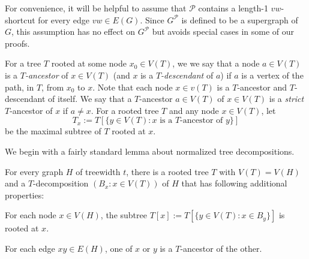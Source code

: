 \documentclass{patmorin}
\newcommand{\tlabel}[1]{\label{t:#1}}
\newcommand{\PP}{\mathcal{P}}
\renewcommand{\le}{\leqslant}
\begin{document}
For convenience, it will be helpful to assume that $\mathcal{P}$ contains a length-1 $vw$-shortcut for every edge $vw\in E(G)$.  Since $G^\PP$ is defined to be a supergraph of $G$, this assumption has no effect on $G^{\mathcal{P}}$ but avoids special cases in some of our proofs.

For a tree $T$ rooted at some node $x_0\in V(T)$, we we say that a node $a\in V(T)$ is a \emph{$T$-ancestor} of $x\in V(T)$ (and $x$ is a \emph{$T$-descendant} of $a$) if $a$ is a vertex of the path, in $T$, from $x_0$ to $x$.  Note that each node $x\in v(T)$ is a $T$-ancestor and $T$-descendant of itself.  We say that a $T$-ancestor $a\in V(T)$ of $x\in V(T)$ is a \emph{strict} $T$-ancestor of $x$ if $a\neq x$. For a rooted tree $T$ and any node $x\in V(T)$, let  
\[T_x := T[\{y\in V(T):\mbox{$x$ is a $T$-ancestor of $y$}\}] \]
be the maximal subtree of $T$ rooted at $x$.  

We begin with a fairly standard lemma about normalized tree decompositions. 

\begin{lem}
  For every graph $H$ of treewidth $t$, there is a rooted tree $T$ with $V(T)=V(H)$ and a $T$-decomposition $(B_x:x\in V(T))$ of $H$ that has following additional properties:  
  \begin{compactenum}[(T1)]
    \item\tlabel{subtree-root} For each node $x\in V(H)$, the subtree $T[x]:=T[\{y\in V(T):x\in B_y\}]$ is rooted at $x$.
    \item\tlabel{ancestor-edge}\tlabel{last} For each edge $xy\in E(H)$, one of $x$ or $y$ is a $T$-ancestor of the other.
  \end{compactenum}
\end{lem}
\end{document}
